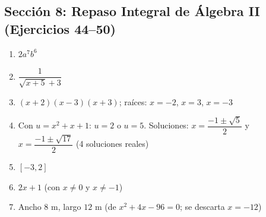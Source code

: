\documentclass[12pt, letterpaper]{article}
\begin{document}
      \subsection*{Sección 8: Repaso Integral de Álgebra II (Ejercicios 44--50)}
      \begin{enumerate}[resume=respuestas, leftmargin=*, label=\textbf{\arabic*.}]
            \item $2a^7 b^6$
            \item $\dfrac{1}{\sqrt{x + 5} + 3}$
            \item $(x + 2)(x - 3)(x + 3)$; \quad raíces: $x = -2$, $x = 3$, $x = -3$
            \item Con $u = x^2 + x + 1$: $u = 2$ o $u = 5$. Soluciones:
                  $x = \dfrac{-1 \pm \sqrt{5}}{2}$ \quad y \quad $x = \dfrac{-1 \pm \sqrt{17}}{2}$ \quad (4 soluciones reales)
            \item $[-3, 2]$
            \item $2x + 1$ \quad (con $x \neq 0$ y $x \neq -1$)
            \item Ancho $8$ m, largo $12$ m \quad (de $x^2 + 4x - 96 = 0$; se descarta $x = -12$)
      \end{enumerate}
\fi
\end{document}
